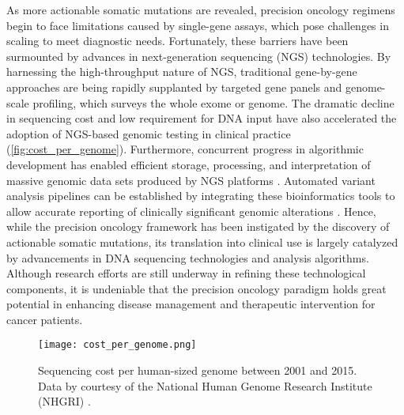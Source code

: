 As more actionable somatic mutations are revealed, precision oncology regimens begin to face limitations caused by single-gene assays, which pose challenges in scaling to meet diagnostic needs. Fortunately, these barriers have been surmounted by advances in next-generation sequencing (\acs{NGS}) technologies. By harnessing the high-throughput nature of NGS, traditional gene-by-gene approaches are being rapidly supplanted by targeted gene panels and genome-scale profiling, which surveys the whole exome or genome. The dramatic decline in sequencing cost \cite{Wetterstrand2016} and low requirement for DNA input \cite{Rykalina2014, Chung2016, So2017} have also accelerated the adoption of NGS-based genomic testing in clinical practice (\autoref{fig:cost_per_genome}). Furthermore, concurrent progress in algorithmic development has enabled efficient storage, processing, and interpretation of massive genomic data sets produced by NGS platforms \cite{Torri2012, Pabinger2014}. Automated variant analysis pipelines can be established by integrating these bioinformatics tools to allow accurate reporting of clinically significant genomic alterations \cite{Hyman2015, Laskin2015, Bosdet2013, Sheffield2016}. Hence, while the precision oncology framework has been instigated by the discovery of actionable somatic mutations, its translation into clinical use is largely catalyzed by advancements in \acs{DNA} sequencing technologies and analysis algorithms. Although research efforts are still underway in refining these technological components, it is undeniable that the precision oncology paradigm holds great potential in enhancing disease management and therapeutic intervention for cancer patients.


\begin{figure}[H]
	\centering
	\texttt{[image: cost\_per\_genome.png]}
	\caption[Sequencing cost per human-sized genome between 2001 and 2015.]{Sequencing cost per human-sized genome between 2001 and 2015. Data by courtesy of the National Human Genome Research Institute (\acs{NHGRI}) \cite{Wetterstrand2016}.}
	\label{fig:cost_per_genome}
\end{figure}


\newpage
